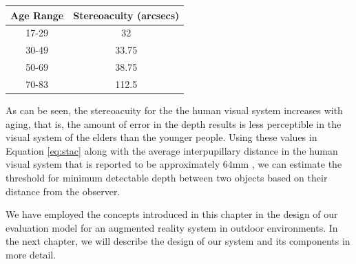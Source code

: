 \begin{minipage}{\linewidth}
\begin{center}
\label{tab:stAcAge}
\begin{tabular}{ |c|c| }
\hline
\textbf{Age Range} & \textbf{Stereoacuity (arcsecs)} \\ \hline
17-29 & 32 \\  \hline
30-49 & 33.75 \\ \hline
50-69 & 38.75 \\ \hline
70-83 & 112.5 \\ \hline
\end{tabular}
\end{center}
\end{minipage} \newline \newline

As can be seen, the stereoacuity for the the human visual system increases with aging, that is, 
the amount of error in the depth results 
is less perceptible in the visual system of the elders than the younger people.
Using these values in Equation \ref{eq:stac} along with the average interpupillary distance in the human visual system 
that is reported to be approximately $64$mm \cite{how95}, 
we can estimate the threshold for minimum detectable depth
between two objects based on their distance from the observer. \newline 

We have employed the concepts introduced in this chapter in the design of our evaluation model for an augmented reality system 
in outdoor environments.
In the next chapter, we will describe the design of our system and its components in more detail.
